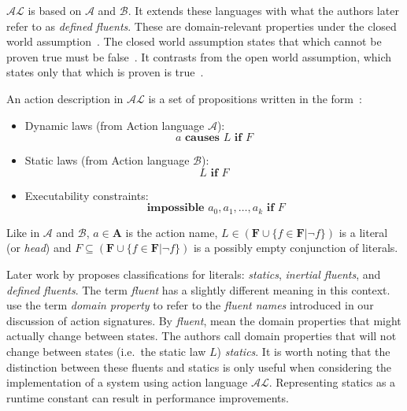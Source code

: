 $ \mathcal{AL} $ is based on $ \mathcal{A} $ and $ \mathcal{B} $.
It extends these languages with what the authors later refer to as \textit{defined fluents}.
These are domain-relevant properties under the closed world assumption~\citep{blount_architecture_2013}.
The closed world assumption states that which cannot be proven true must be false~\citep{reiter_closed_1981}.
It contrasts from the open world assumption, which states only that which is proven is true~\citep{reiter_closed_1981}.

An action description in $ \mathcal{AL} $ is a set of propositions written in the form~\citep{baral_reasoning_2000, blount_architecture_2013}:

\begin{itemize}
    \item Dynamic laws (from Action language $ \mathcal{A} $):
        \begin{equation}
            a \textbf{ causes } L \textbf{ if } F
        \end{equation}

    \item Static laws (from Action language $ \mathcal{B} $):
        \begin{equation}
            L \textbf{ if } F
        \end{equation}

    \item Executability constraints:
        \begin{equation}
            \textbf{ impossible } a_0, a_1, \dots, a_k \textbf{ if } F
        \end{equation}
\end{itemize}

Like in $\mathcal{A}$ and $\mathcal{B}$, $a \in \boldsymbol{A}$ is the action name, $L \in(\boldsymbol{F} \cup\{f \in \boldsymbol{F}| \neg f\}) $ is a literal (or \textit{head}) and $F \subseteq(\boldsymbol{F} \cup\{f \in \boldsymbol{F}| \neg f\})$ is a possibly empty conjunction of literals.

Later work by \citet{gelfond_knowledge_2014} proposes classifications for literals: \textit{statics}, \textit{inertial fluents}, and \textit{defined fluents}.
The term \textit{fluent} has a slightly different meaning in this context.
\citet{gelfond_knowledge_2014} use the term \textit{domain property} to refer to the \textit{fluent names} introduced in our discussion of action signatures.
By \textit{fluent}, \citet{gelfond_knowledge_2014} mean the domain properties that might actually change between states.
The authors call domain properties that will not change between states (i.e.~the static law $L$) \textit{statics}.
It is worth noting that the distinction between these fluents and statics is only useful when considering the implementation of a system using action language $\mathcal{AL}$.
Representing statics as a runtime constant can result in performance improvements.

